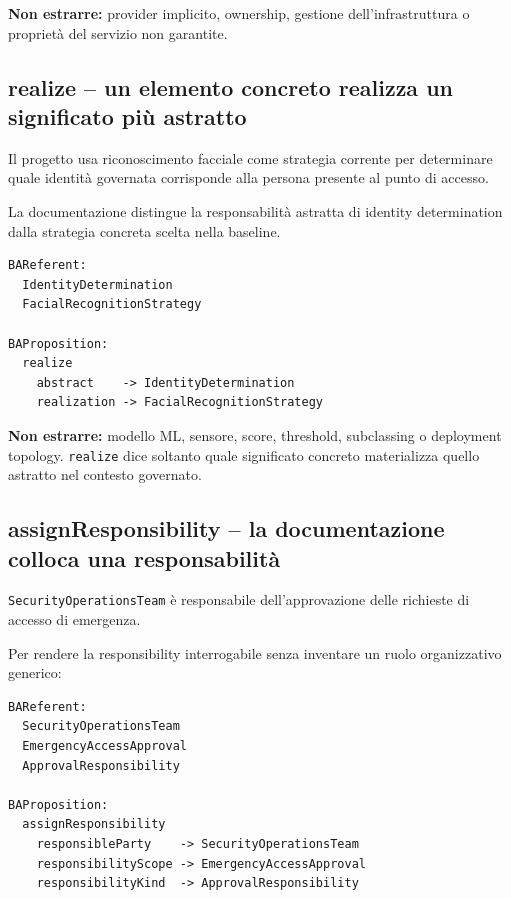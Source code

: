 \documentclass[11pt,a4paper]{article}
\newcommand{\code}[1]{\nolinkurl{#1}}
\begin{document}
\textbf{Non estrarre:} provider implicito, ownership, gestione dell'infrastruttura o proprietà del servizio non garantite.

\subsection{realize -- un elemento concreto realizza un significato più astratto}

\begin{examplebox}
Il progetto usa riconoscimento facciale come strategia corrente per determinare quale identità governata corrisponde alla persona presente al punto di accesso.
\end{examplebox}

La documentazione distingue la responsabilità astratta di identity determination dalla strategia concreta scelta nella baseline.

\begin{lstlisting}
BAReferent:
  IdentityDetermination
  FacialRecognitionStrategy

BAProposition:
  realize
    abstract    -> IdentityDetermination
    realization -> FacialRecognitionStrategy
\end{lstlisting}

\textbf{Non estrarre:} modello ML, sensore, score, threshold, subclassing o deployment topology. \code{realize} dice soltanto quale significato concreto materializza quello astratto nel contesto governato.

\subsection{assignResponsibility -- la documentazione colloca una responsabilità}

\begin{examplebox}
\code{SecurityOperationsTeam} è responsabile dell'approvazione delle richieste di accesso di emergenza.
\end{examplebox}

Per rendere la responsibility interrogabile senza inventare un ruolo organizzativo generico:

\begin{lstlisting}
BAReferent:
  SecurityOperationsTeam
  EmergencyAccessApproval
  ApprovalResponsibility

BAProposition:
  assignResponsibility
    responsibleParty    -> SecurityOperationsTeam
    responsibilityScope -> EmergencyAccessApproval
    responsibilityKind  -> ApprovalResponsibility
\end{lstlisting}
\end{document}
